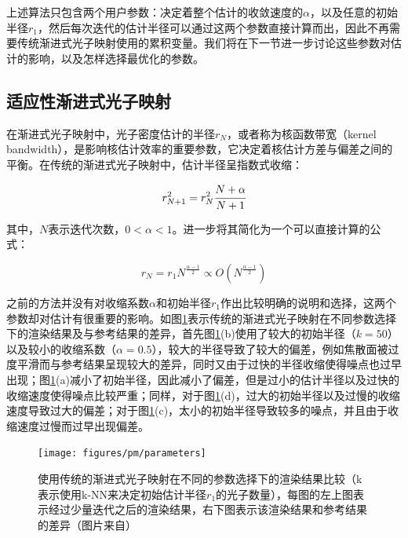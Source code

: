 上述算法只包含两个用户参数：决定着整个估计的收敛速度的$\alpha$，以及任意的初始半径$r_1$，然后每次迭代的估计半径可以通过这两个参数直接计算而出，因此不再需要传统渐进式光子映射使用的累积变量。我们将在下一节进一步讨论这些参数对估计的影响，以及怎样选择最优化的参数。





\subsection{适应性渐进式光子映射}\label{sec:pm-adaptive-ppm}
在渐进式光子映射中，光子密度估计的半径$r_N$，或者称为核函数带宽（kernel bandwidth），是影响核估计效率的重要参数，它决定着核估计方差与偏差之间的平衡。在传统的渐进式光子映射\cite{a:ProgressivePhotonMapping,a:ProgressivePhotonMappingAProbabilisticApproach}中，估计半径呈指数式收缩：

\begin{equation}
	r^{2}_{N+1}=r^{2}_{N} \cfrac{N+\alpha}{N+1}
\end{equation}

其中，$N$表示迭代次数，$0<\alpha<1$。\cite{a:AdaptiveProgressivePhotonMapping}进一步将其简化为一个可以直接计算的公式：

\begin{equation}\label{e:pm-radius}
	r_N=r_{1}N^{ \frac{\alpha-1}{2}}\propto O(N^{ \frac{\alpha-1}{2}})
\end{equation}

之前的方法并没有对收缩系数$\alpha$和初始半径$r_1$作出比较明确的说明和选择，这两个参数却对估计有很重要的影响。如图\ref{f:pm-parameters}表示传统的渐进式光子映射在不同参数选择下的渲染结果及与参考结果的差异，首先图\ref{f:pm-parameters}(b)使用了较大的初始半径（$k=50$）以及较小的收缩系数（$\alpha=0.5$），较大的半径导致了较大的偏差，例如焦散面被过度平滑而与参考结果呈现较大的差异，同时又由于过快的半径收缩使得噪点也过早出现；图\ref{f:pm-parameters}(a)减小了初始半径，因此减小了偏差，但是过小的估计半径以及过快的收缩速度使得噪点比较严重；同样，对于图\ref{f:pm-parameters}(d)，过大的初始半径以及过慢的收缩速度导致过大的偏差；对于图\ref{f:pm-parameters}(c)，太小的初始半径导致较多的噪点，并且由于收缩速度过慢而过早出现偏差。

\begin{figure}
\begin{fullwidth}
	\texttt{[image: figures/pm/parameters]}
	\caption{使用传统的渐进式光子映射在不同的参数选择下的渲染结果比较（k表示使用k-NN来决定初始估计半径$r_1$的光子数量），每图的左上图表示经过少量迭代之后的渲染结果，右下图表示该渲染结果和参考结果的差异（图片来自\cite{a:AdaptiveProgressivePhotonMapping}）}	
	\label{f:pm-parameters}
\end{fullwidth}
\end{figure}

